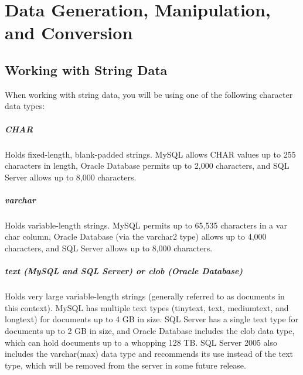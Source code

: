 \chapter{Data Generation, Manipulation, and Conversion\label{Ch07}}

\section{Working with String Data}
When working with string data, you will be using one of the following character data types:
\paragraph{CHAR} Holds fixed-length, blank-padded strings. MySQL allows CHAR values up to 255 characters in length, Oracle Database permits up to 2,000 characters, and SQL Server allows up to 8,000 characters.

\paragraph{varchar} Holds variable-length strings. MySQL permits up to 65,535 characters in a var char column, Oracle Database (via the varchar2 type) allows up to 4,000 characters, and SQL Server allows up to 8,000 characters.

\paragraph{text (MySQL and SQL Server) or clob (Oracle Database)} Holds very large variable-length strings (generally referred to as documents in this context). MySQL has multiple text types (tinytext, text, mediumtext, and longtext) for documents up to 4 GB in size. SQL Server has a single text type for documents up to 2 GB in size, and Oracle Database includes the clob data type, which can hold documents up to a whopping 128 TB. SQL Server 2005 also includes the varchar(max) data type and recommends its use instead of the text type, which will be removed from the server in some future release.